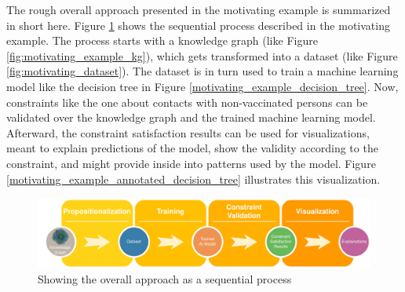     The rough overall approach presented in the motivating example is summarized in short here. Figure \ref{fig:overall_approach} shows the sequential process described in the motivating example. The process starts with a knowledge graph (like Figure \ref{fig:motivating_example_kg}), which gets transformed into a dataset (like Figure \ref{fig:motivating_dataset}). The dataset is in turn used to train a machine learning model like the decision tree in Figure \ref{motivating_example_decision_tree}. Now, constraints like the one about contacts with non-vaccinated persons can be validated over the knowledge graph and the trained machine learning model. Afterward, the constraint satisfaction results can be used for visualizations, meant to explain predictions of the model, show the validity according to the constraint, and might provide inside into patterns used by the model. Figure \ref{motivating_example_annotated_decision_tree} illustrates this visualization.
    
    
    \begin{figure}
        \centering
        \includegraphics[width=\textwidth]{images/motivating_example/overall_approach.png}
        \caption{Showing the overall approach as a sequential process}
        \label{fig:overall_approach}
    \end{figure}